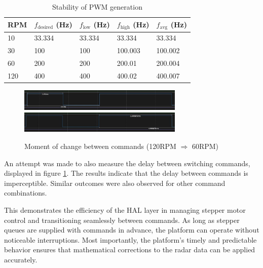 \begin{table}[h!]
  \centering
  \caption[Stability of PWM generation]{Stability of PWM generation}
  \begin{tabular}{| m{2cm} || m{2.5cm} | m{2.5cm} | m{2.5cm} | m{2.5cm} |}
    \hline
    RPM & $f_{\mathrm{desired}}$ (Hz) & $f_{\mathrm{low}}$ (Hz) & $f_{\mathrm{high}}$ (Hz) & $f_\mathrm{avg}$ (Hz) \\
    \hline
    10  & 33.334                      & 33.334                  & 33.334                   & 33.334                \\
    30  & 100                         & 100                     & 100.003                  & 100.002               \\
    60  & 200                         & 200                     & 200.01                   & 200.004               \\
    120 & 400                         & 400                     & 400.02                   & 400.007               \\
    \hline
  \end{tabular}
  \label{tab:performancepwm}
\end{table}

\begin{figure}[h!]
	\centering
	\includegraphics[width=0.7\textwidth]{../img/120rpm_to60_1.jpg}
	\includegraphics[width=0.7\textwidth]{../img/120rpm_to60_2.jpg}
	\caption[Moment of change between commands with 120RPM and 60RPM]{Moment of change between commands (120RPM $\Rightarrow$  60RPM)}
	\label{fig:switching}
\end{figure}

An attempt was made to also measure the delay  between switching commands, displayed in figure \ref{fig:switching}.
The results indicate that the delay between commands is imperceptible.
Similar outcomes were also observed for other command combinations.

This demonstrates the efficiency of the HAL layer in managing stepper motor control and transitioning seamlessly between commands.
As long as stepper queues are supplied with commands in advance, the platform can operate without noticeable interruptions.
Most importantly, the platform’s timely and predictable behavior ensures that mathematical corrections to the radar data can be applied accurately.

